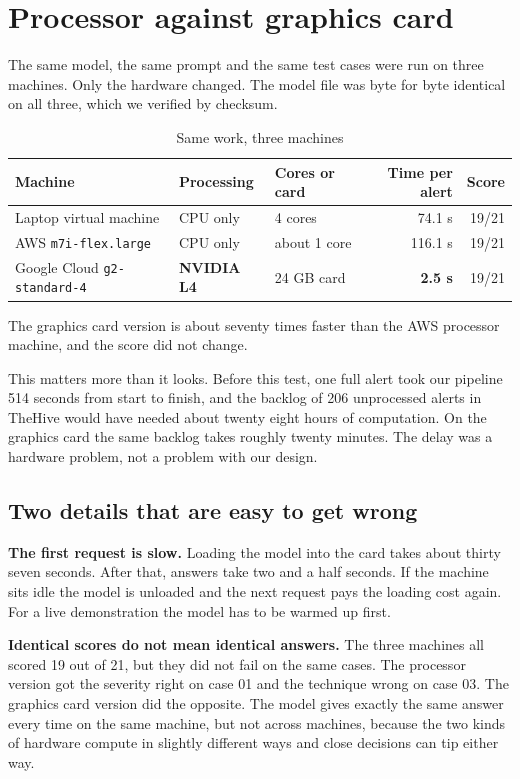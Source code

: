 \documentclass[11pt,a4paper]{article}
\newcommand{\best}[1]{\textbf{#1}}
\begin{document}
\section{Processor against graphics card}

The same model, the same prompt and the same test cases were run on three machines.
Only the hardware changed. The model file was byte for byte identical on all three,
which we verified by checksum.

\begin{table}[h]
\centering
\small
\caption{Same work, three machines}
\begin{tabular}{@{}lllrr@{}}
\toprule
\textbf{Machine} & \textbf{Processing} & \textbf{Cores or card}
  & \textbf{Time per alert} & \textbf{Score} \\
\midrule
Laptop virtual machine & CPU only & 4 cores          & 74.1 s & 19/21 \\
AWS \texttt{m7i-flex.large} & CPU only & about 1 core & 116.1 s & 19/21 \\
Google Cloud \texttt{g2-standard-4} & \best{NVIDIA L4} & 24 GB card
  & \best{2.5 s} & 19/21 \\
\bottomrule
\end{tabular}
\end{table}

The graphics card version is about seventy times faster than the AWS processor
machine, and the score did not change.

This matters more than it looks. Before this test, one full alert took our pipeline
514 seconds from start to finish, and the backlog of 206 unprocessed alerts in
TheHive would have needed about twenty eight hours of computation. On the graphics
card the same backlog takes roughly twenty minutes. The delay was a hardware problem,
not a problem with our design.

\subsection{Two details that are easy to get wrong}

\textbf{The first request is slow.} Loading the model into the card takes about
thirty seven seconds. After that, answers take two and a half seconds. If the machine
sits idle the model is unloaded and the next request pays the loading cost again.
For a live demonstration the model has to be warmed up first.

\textbf{Identical scores do not mean identical answers.} The three machines all
scored 19 out of 21, but they did not fail on the same cases. The processor version
got the severity right on case 01 and the technique wrong on case 03. The graphics
card version did the opposite. The model gives exactly the same answer every time on
the same machine, but not across machines, because the two kinds of hardware compute
in slightly different ways and close decisions can tip either way.
\end{document}
